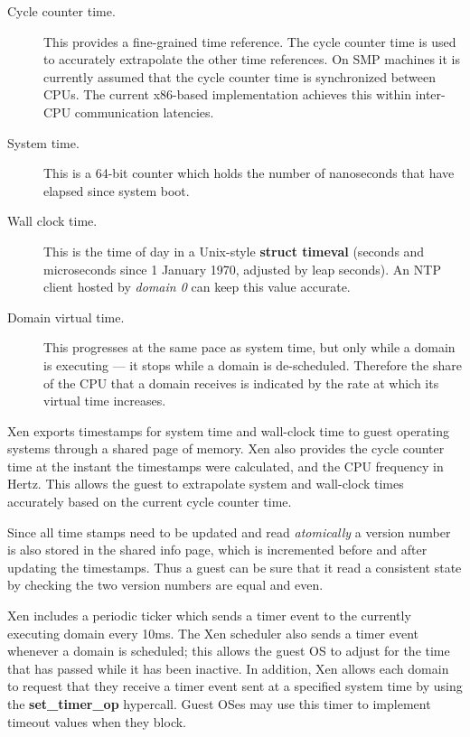 \documentclass[11pt,twoside,final,openright]{report}
\begin{document}
\begin{description}
\item[Cycle counter time.]

  This provides a fine-grained time reference.  The cycle counter time
  is used to accurately extrapolate the other time references.  On SMP
  machines it is currently assumed that the cycle counter time is
  synchronized between CPUs.  The current x86-based implementation
  achieves this within inter-CPU communication latencies.

\item[System time.]

  This is a 64-bit counter which holds the number of nanoseconds that
  have elapsed since system boot.

\item[Wall clock time.]

  This is the time of day in a Unix-style {\bf struct timeval}
  (seconds and microseconds since 1 January 1970, adjusted by leap
  seconds).  An NTP client hosted by {\it domain 0} can keep this
  value accurate.

\item[Domain virtual time.]

  This progresses at the same pace as system time, but only while a
  domain is executing --- it stops while a domain is de-scheduled.
  Therefore the share of the CPU that a domain receives is indicated
  by the rate at which its virtual time increases.

\end{description}


Xen exports timestamps for system time and wall-clock time to guest
operating systems through a shared page of memory.  Xen also provides
the cycle counter time at the instant the timestamps were calculated,
and the CPU frequency in Hertz.  This allows the guest to extrapolate
system and wall-clock times accurately based on the current cycle
counter time.

Since all time stamps need to be updated and read \emph{atomically}
a version number is also stored in the shared info page, which is
incremented before and after updating the timestamps. Thus a guest can
be sure that it read a consistent state by checking the two version
numbers are equal and even.

Xen includes a periodic ticker which sends a timer event to the
currently executing domain every 10ms.  The Xen scheduler also sends a
timer event whenever a domain is scheduled; this allows the guest OS
to adjust for the time that has passed while it has been inactive.  In
addition, Xen allows each domain to request that they receive a timer
event sent at a specified system time by using the {\bf
  set\_timer\_op} hypercall.  Guest OSes may use this timer to
implement timeout values when they block.
\end{document}
